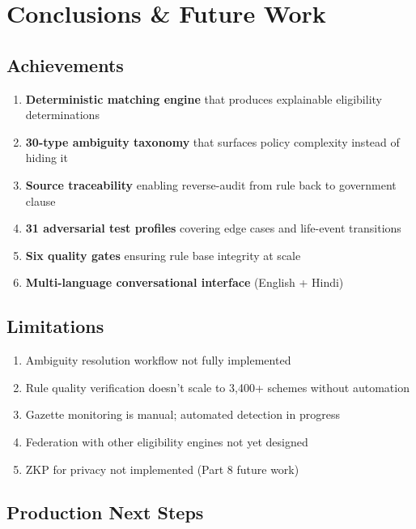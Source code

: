 \documentclass[11pt,a4paper]{report}
\begin{document}
\chapter{Conclusions \& Future Work}

\section{Achievements}

\begin{enumerate}
  \item \textbf{Deterministic matching engine} that produces explainable eligibility determinations
  \item \textbf{30-type ambiguity taxonomy} that surfaces policy complexity instead of hiding it
  \item \textbf{Source traceability} enabling reverse-audit from rule back to government clause
  \item \textbf{31 adversarial test profiles} covering edge cases and life-event transitions
  \item \textbf{Six quality gates} ensuring rule base integrity at scale
  \item \textbf{Multi-language conversational interface} (English + Hindi)
\end{enumerate}

\section{Limitations}

\begin{enumerate}
  \item Ambiguity resolution workflow not fully implemented
  \item Rule quality verification doesn't scale to 3,400+ schemes without automation
  \item Gazette monitoring is manual; automated detection in progress
  \item Federation with other eligibility engines not yet designed
  \item ZKP for privacy not implemented (Part 8 future work)
\end{enumerate}

\section{Production Next Steps}
\end{document}
